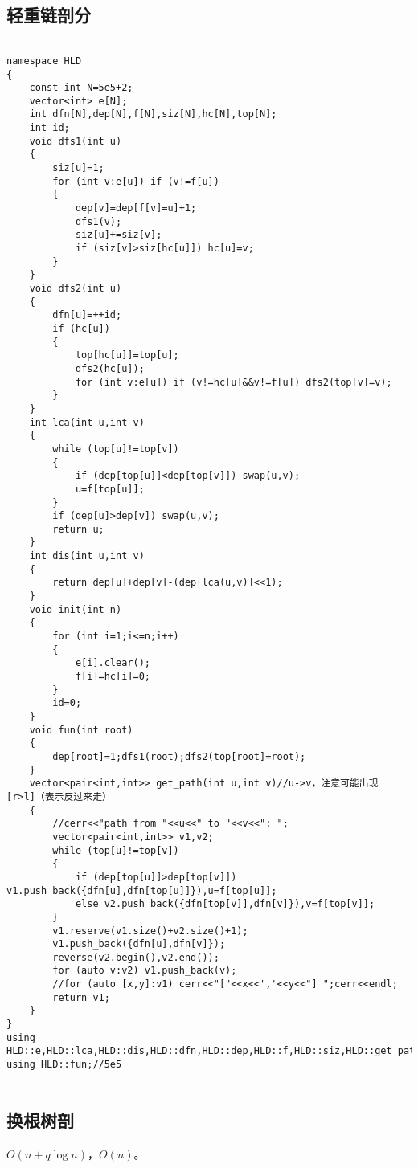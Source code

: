 \documentclass{ctexart}
\begin{document}
\subsection{轻重链剖分}

\begin{lstlisting}

namespace HLD
{
	const int N=5e5+2;
	vector<int> e[N];
	int dfn[N],dep[N],f[N],siz[N],hc[N],top[N];
	int id;
	void dfs1(int u)
	{
		siz[u]=1;
		for (int v:e[u]) if (v!=f[u])
		{
			dep[v]=dep[f[v]=u]+1;
			dfs1(v);
			siz[u]+=siz[v];
			if (siz[v]>siz[hc[u]]) hc[u]=v;
		}
	}
	void dfs2(int u)
	{
		dfn[u]=++id;
		if (hc[u])
		{
			top[hc[u]]=top[u];
			dfs2(hc[u]);
			for (int v:e[u]) if (v!=hc[u]&&v!=f[u]) dfs2(top[v]=v);
		}
	}
	int lca(int u,int v)
	{
		while (top[u]!=top[v])
		{
			if (dep[top[u]]<dep[top[v]]) swap(u,v);
			u=f[top[u]];
		}
		if (dep[u]>dep[v]) swap(u,v);
		return u;
	}
	int dis(int u,int v)
	{
		return dep[u]+dep[v]-(dep[lca(u,v)]<<1);
	}
	void init(int n)
	{
		for (int i=1;i<=n;i++)
		{
			e[i].clear();
			f[i]=hc[i]=0;
		}
		id=0;
	}
	void fun(int root)
	{
		dep[root]=1;dfs1(root);dfs2(top[root]=root);
	}
	vector<pair<int,int>> get_path(int u,int v)//u->v，注意可能出现 [r>l]（表示反过来走）
	{
		//cerr<<"path from "<<u<<" to "<<v<<": ";
		vector<pair<int,int>> v1,v2;
		while (top[u]!=top[v])
		{
			if (dep[top[u]]>dep[top[v]]) v1.push_back({dfn[u],dfn[top[u]]}),u=f[top[u]];
			else v2.push_back({dfn[top[v]],dfn[v]}),v=f[top[v]];
		}
		v1.reserve(v1.size()+v2.size()+1);
		v1.push_back({dfn[u],dfn[v]});
		reverse(v2.begin(),v2.end());
		for (auto v:v2) v1.push_back(v);
		//for (auto [x,y]:v1) cerr<<"["<<x<<','<<y<<"] ";cerr<<endl;
		return v1;
	}
}
using HLD::e,HLD::lca,HLD::dis,HLD::dfn,HLD::dep,HLD::f,HLD::siz,HLD::get_path;
using HLD::fun;//5e5


\end{lstlisting}

\subsection{换根树剖}

$O(n+q\log n)$，$O(n)$。
\end{document}
